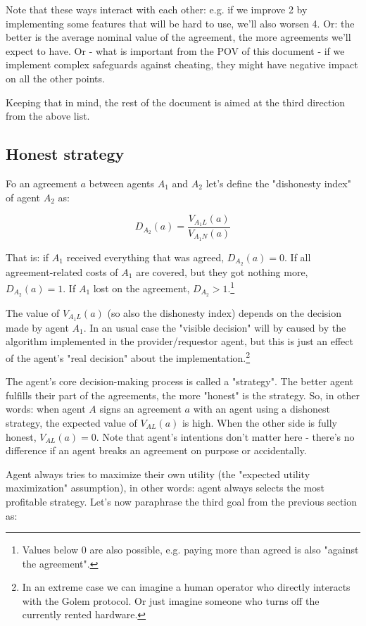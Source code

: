 \documentclass{article}
\begin{document}
Note that these ways interact with each other: e.g. if we improve 2 by implementing some features that will be hard to use, we'll also worsen 4.
Or: the better is the average nominal value of the agreement, the more agreements we'll expect to have.
Or - what is important from the POV of this document - if we implement complex safeguards against cheating, they might have negative impact on all the other points.

Keeping that in mind, the rest of the document is aimed at the third direction from the above list.

\subsection{Honest strategy}

Fo an agreement $a$ between agents $A_1$ and $A_2$ let's define the "dishonesty index" of agent $A_2$ as:

\begin{equation}
    D_{A_2}(a) = \frac{V_{A_1L}(a)}{V_{A_1N}(a)}
\end{equation}

 
That is: if $A_1$ received everything that was agreed, $D_{A_2}(a) = 0$. If all agreement-related costs of $A_1$ are covered, but they got nothing more, $D_{A_2}(a) = 1$.
If $A_1$ lost on the agreement, $D_{A_2} > 1$.\footnote{Values below 0 are also possible, e.g. paying more than agreed is also "against the agreement".}

The value of $V_{A_1L}(a)$ (so also the dishonesty index) depends on the decision made by agent $A_1$. 
In an usual case the "visible decision" will by caused by the algorithm implemented in the provider/requestor agent,
but this is just an effect of the agent's "real decision" about the implementation.\footnote{In an extreme case we can imagine 
a human operator who directly interacts with the Golem protocol. Or just imagine someone who turns off the currently rented hardware.}

The agent's core decision-making process is called a "strategy". The better agent fulfills their part of the agreements, the more "honest" is the strategy.
So, in other words: when agent $A$ signs an agreement $a$ with an agent using a dishonest strategy, the expected value of $V_{AL}(a)$ is high.
When the other side is fully honest, $V_{AL}(a) = 0$. 
Note that agent's intentions don't matter here - there's no difference if an agent breaks an agreement on purpose or accidentally.
 
Agent always tries to maximize their own utility (the "expected utility maximization" assumption), in other words: agent always selects the most profitable strategy.
Let's now paraphrase the third goal from the previous section as:
\end{document}

